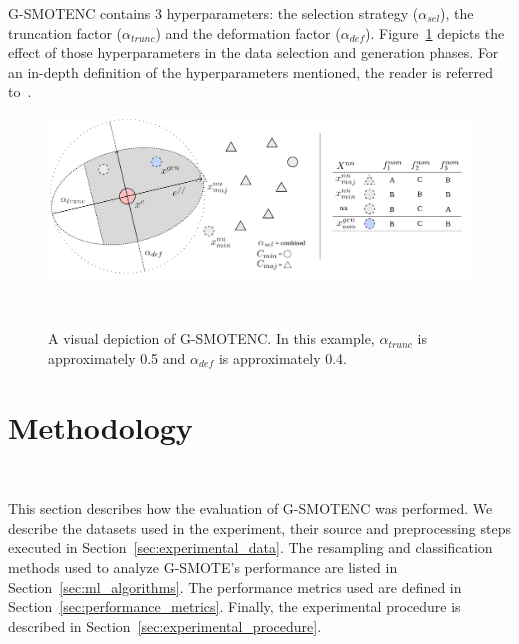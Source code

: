\documentclass[preprint,12pt]{elsarticle}
\begin{document}
{\begin{algorithm}

\end{algorithm}

G-SMOTENC contains 3 hyperparameters: the selection strategy ($\alpha_{sel}$),
the truncation factor ($\alpha_{trunc}$) and the deformation factor
($\alpha_{def}$). Figure~\ref{fig:gsmote} depicts the effect of those
hyperparameters in the data selection and generation phases. For an in-depth
definition of the hyperparameters mentioned, the reader is referred
to~\cite{douzas2019geometric}.

\begin{figure}
	\centering
	\includegraphics[width=\linewidth]{../analysis/g-smote}
    \caption{A visual depiction of G-SMOTENC. In this example,
        $\alpha_{trunc}$ is approximately 0.5 and $\alpha_{def}$ is
        approximately 0.4.
    }~\label{fig:gsmote}
\end{figure}


\section{Methodology}~\label{sec:methodology}

This section describes how the evaluation of G-SMOTENC was performed. We
describe the datasets used in the experiment, their source and preprocessing
steps executed in Section~\ref{sec:experimental_data}. The resampling and
classification methods used to analyze G-SMOTE's performance are listed in
Section~\ref{sec:ml_algorithms}. The performance metrics used are defined in
Section~\ref{sec:performance_metrics}. Finally, the experimental procedure is
described in Section~\ref{sec:experimental_procedure}.

}
\end{document}
